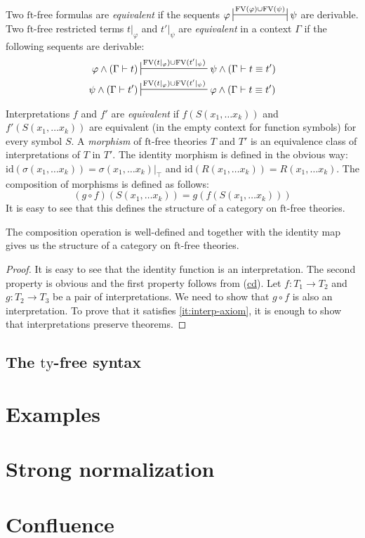 \documentclass[reqno]{amsart}
\newcommand{\axref}[1]{(\hyperref[ax:#1]{#1})}
\theoremstyle{definition}
\theoremstyle{remark}
\newcommand{\fs}[1]{\mathrm{#1}}
\newcommand{\FV}{\fs{FV}}
\newcommand{\ft}{\fs{ft}}
\newcommand{\ty}{\fs{ty}}
\newcommand{\id}{\fs{id}}
\numberwithin{figure}{section}
\begin{document}
Two $\ft$-free formulas are \emph{equivalent} if the sequents $\varphi \ssststile{}{\FV(\varphi) \cup \FV(\psi)} \psi$ are derivable.
Two $\ft$-free restricted terms $t|_\varphi$ and $t'|_\psi$ are \emph{equivalent} in a context $\Gamma$ if the following sequents are derivable:
\begin{align*}
\varphi \land (\Gamma \vdash t) & \sststile{}{\FV(t|_\varphi) \cup \FV(t'|_\psi)} \psi \land (\Gamma \vdash t \equiv t') \\
\psi \land (\Gamma \vdash t') & \sststile{}{\FV(t|_\varphi) \cup \FV(t'|_\psi)} \varphi \land (\Gamma \vdash t \equiv t')
\end{align*}

Interpretations $f$ and $f'$ are \emph{equivalent} if $f(S(x_1, \ldots x_k))$ and $f'(S(x_1, \ldots x_k))$ are equivalent (in the empty context for function symbols) for every symbol $S$.
A \emph{morphism} of $\ft$-free theories $T$ and $T'$ is an equivalence class of interpretations of $T$ in $T'$.
The identity morphism is defined in the obvious way: $\id(\sigma(x_1, \ldots x_k)) = \sigma(x_1, \ldots x_k)|_\top$ and $\id(R(x_1, \ldots x_k)) = R(x_1, \ldots x_k)$.
The composition of morphisms is defined as follows:
\[ (g \circ f)(S(x_1, \ldots x_k)) = g(f(S(x_1, \ldots x_k))) \]
It is easy to see that this defines the structure of a category on $\ft$-free theories.

\begin{prop}
The composition operation is well-defined and together with the identity map gives us the structure of a category on $\ft$-free theories.
\end{prop}
\begin{proof}
It is easy to see that the identity function is an interpretation.
The second property is obvious and the first property follows from \axref{cd}.
Let $f : T_1 \to T_2$ and $g : T_2 \to T_3$ be a pair of interpretations.
We need to show that $g \circ f$ is also an interpretation.
To prove that it satisfies \eqref{it:interp-axiom}, it is enough to show that interpretations preserve theorems.
\end{proof}

\subsection{The $\ty$-free syntax}
\label{sec:types}

\section{Examples}

\section{Strong normalization}

\section{Confluence}



\end{document}
